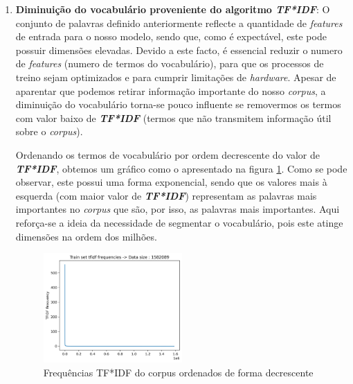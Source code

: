 \begin{enumerate}
Para mais detalhes, é favor consultar \cite{TF_IDF_algorithm}.

Apenas de referir que nesta etapa foram considerados todos os uni-gramas e bigramas \footnote{\textbf{n-grama}: É uma sequência contínua de \textbf{N} itens de uma determinada amostra de texto. Neste caso foram considerados n = 1 e n = 2}. Após o processo estar completo este algoritmo retorna um conjunto de termos (palavras) com o respectivo valor \textbf{\textit{TF*IDF}} mapeado. Este conjunto de palavras define o vocabulário do nosso \textit{corpus}. 

\bigbreak
\item \textbf{Diminuição do vocabulário proveniente do algoritmo \textit{TF*IDF}}: O conjunto de palavras definido anteriormente reflecte a quantidade de \textit{features} de entrada para o nosso modelo, sendo que, como é expectável, este pode possuir dimensões elevadas. Devido a este facto, é essencial reduzir o numero de \textit{features} (numero de termos do vocabulário), para que os processos de treino sejam optimizados e para cumprir limitações de \textit{hardware}. Apesar de aparentar que podemos retirar informação importante do nosso \textit{corpus}, a diminuição do vocabulário torna-se pouco influente se removermos os termos com valor baixo de \textbf{\textit{TF*IDF}} (termos que não transmitem informação útil sobre o \textit{corpus}). 

Ordenando os termos de vocabulário por ordem decrescente do valor de \textbf{\textit{TF*IDF}}, obtemos um gráfico como o apresentado na figura \ref{diagram:data_n_knee}. Como se pode observar, este possui uma forma exponencial, sendo que os valores mais à esquerda (com maior valor de \textbf{\textit{TF*IDF}}) representam as palavras mais importantes no \textit{corpus} que são, por isso, as palavras mais importantes. Aqui reforça-se a ideia da necessidade de segmentar o vocabulário, pois este atinge dimensões na ordem dos milhões.

\begin{figure}[t]
\begin{center}
\includegraphics[width=0.5\textwidth,keepaspectratio]{figures/data_n_knee.png}
\caption{Frequências TF*IDF do corpus ordenados de forma decrescente }
\label{diagram:data_n_knee}
\centering
\end{center}
\end{figure}


\end{enumerate}
